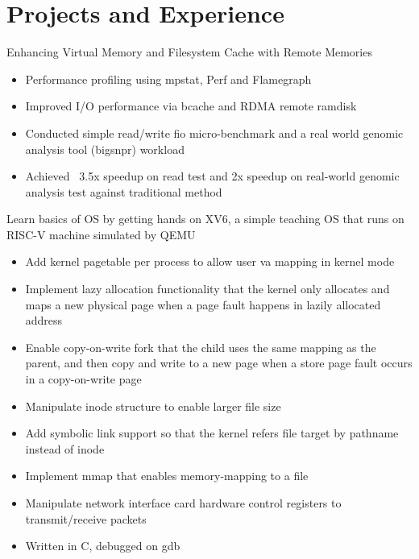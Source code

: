 \section{Projects and Experience}

{Enhancing Virtual Memory and Filesystem Cache with Remote Memories}
{}
{}

\begin{itemize}
		\setlength\topsep{0em}
		\setlength\parskip{0em}
		\setlength\parsep{0em}
		\setlength\itemsep{0em}
	\item Performance profiling using mpstat, Perf and Flamegraph
	\item Improved I/O performance via bcache and RDMA remote ramdisk
  \item Conducted simple read/write fio micro-benchmark and a real world genomic analysis tool (bigsnpr) workload 
	\item Achieved ~3.5x speedup on read test and 2x speedup on real-world genomic analysis test against traditional method 
\end{itemize}

{Learn basics of OS by getting hands on XV6, a simple teaching OS that runs on RISC-V machine simulated by QEMU} {} {}
\begin{itemize}
\setlength\topsep{-0.1em}
\setlength\parskip{-0.1em}
\setlength\parsep{-0.1em}
\setlength\itemsep{-0.1em}
  \item Add kernel pagetable per process to allow user va mapping in kernel mode  
  \item Implement lazy allocation functionality that the kernel only allocates and maps a new physical page when a page fault happens in lazily allocated address
  \item Enable copy-on-write fork that the child uses the same mapping as the parent, and then copy and write to a new page when a store page fault occurs in a copy-on-write page
  \item Manipulate inode structure to enable larger file size
  \item Add symbolic link support so that the kernel refers file target by pathname instead of inode
  \item Implement mmap that enables memory-mapping to a file
  \item Manipulate network interface card hardware control registers to transmit/receive packets 
  \item Written in C, debugged on gdb
\end{itemize}




